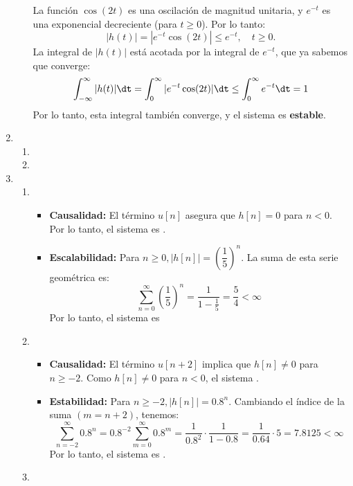 \begin{enumerate}[label=\color{red}\textbf{\arabic*)}]
\begin{enumerate}[label=\color{red}\textbf{\alph*)}]
        La función $\cos(2t)$ es una oscilación de magnitud unitaria, y $e^{-t} $ es una exponencial decreciente (para $t\ge 0$). Por lo tanto: \[
        |h(t)|=|e^{-t}\cos(2t) |\le e^{-t},\quad t\ge 0 .
        \] 
        La integral de $|h(t)|$ está acotada por la integral de  $e^{-t} $, que ya sabemos que converge: \[
        \int_{-\infty}^{\infty} |h(t)|\dt=\int_{0}^{\infty} |e^{-t}\cos(2t) |\dt\le \int_{0}^{\infty} e^{-t}\dt=1    
        \] 
        Por lo tanto, esta integral también converge, y el sistema es \textbf{estable}. 
  \end{enumerate}
\item {} 
  \begin{enumerate}[label=\color{red}\textbf{\alph*)}]
    \item {} 
    \item {} 
  \end{enumerate}
\item {}
  \begin{enumerate}[label=\color{red}\textbf{\alph*)}]
    \item {} 

      \begin{itemize}[label=\textbullet]
        \item \textbf{Causalidad:} El término $u[n]$ asegura que  $h[n]=0$ para  $n<0$. Por lo tanto, el sistema es .
        \item \textbf{Escalabilidad:} Para $n\ge 0,|h[n]|=\left( \dfrac{1}{5} \right) ^{n}$. La suma de esta serie geométrica es: \[
        \sum_{n=0}^{\infty} \left( \dfrac{1}{5} \right) ^n=\dfrac{1}{1-\frac{1}{5} }=\dfrac{5}{4}<\infty
        \] Por lo tanto, el sistema es  
      \end{itemize}
    \item {} 
      \begin{itemize}[label=\textbullet]
        \item \textbf{Causalidad:} El término $u[n+2]$ implica que $h[n]\neq 0$ para $n\ge -2$. Como $h[n]\neq 0$ para $n<0$, el sistema  .
        \item \textbf{Estabilidad:} Para $n\ge -2,|h[n]|=0.8^n$. Cambiando el índice de la suma $(m=n+2)$, tenemos:  \[
        \sum_{n=-2}^{\infty} 0.8^n=0.8^{-2}\sum_{m=0}^{\infty} 0.8^m=\dfrac{1}{0.8^2}\cdot \dfrac{1}{1-0.8}=\dfrac{1}{0.64}\cdot 5=7.8125<\infty
        \] 
        Por lo tanto, el sistema es . 
      \end{itemize}
    \item  {} 


\end{enumerate}
\end{enumerate}
